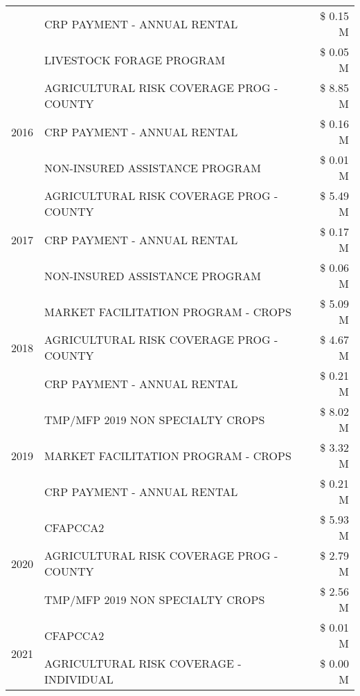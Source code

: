 \begin{tabular}{llr}
 & CRP PAYMENT - ANNUAL RENTAL & \$ 0.15 M \\
 & LIVESTOCK FORAGE PROGRAM & \$ 0.05 M \\
\cline{1-3}
\multirow[t]{3}{*}{2016} & AGRICULTURAL RISK COVERAGE PROG - COUNTY      & \$ 8.85 M \\
 & CRP PAYMENT - ANNUAL RENTAL                   & \$ 0.16 M \\
 & NON-INSURED ASSISTANCE PROGRAM                & \$ 0.01 M \\
\cline{1-3}
\multirow[t]{3}{*}{2017} & AGRICULTURAL RISK COVERAGE PROG - COUNTY & \$ 5.49 M \\
 & CRP PAYMENT - ANNUAL RENTAL & \$ 0.17 M \\
 & NON-INSURED ASSISTANCE PROGRAM & \$ 0.06 M \\
\cline{1-3}
\multirow[t]{3}{*}{2018} & MARKET FACILITATION PROGRAM - CROPS & \$ 5.09 M \\
 & AGRICULTURAL RISK COVERAGE PROG - COUNTY & \$ 4.67 M \\
 & CRP PAYMENT - ANNUAL RENTAL & \$ 0.21 M \\
\cline{1-3}
\multirow[t]{3}{*}{2019} & TMP/MFP 2019 NON SPECIALTY CROPS & \$ 8.02 M \\
 & MARKET FACILITATION PROGRAM - CROPS & \$ 3.32 M \\
 & CRP PAYMENT - ANNUAL RENTAL & \$ 0.21 M \\
\cline{1-3}
\multirow[t]{3}{*}{2020} & CFAPCCA2 & \$ 5.93 M \\
 & AGRICULTURAL RISK COVERAGE PROG - COUNTY & \$ 2.79 M \\
 & TMP/MFP 2019 NON SPECIALTY CROPS & \$ 2.56 M \\
\cline{1-3}
\multirow[t]{2}{*}{2021} & CFAPCCA2 & \$ 0.01 M \\
 & AGRICULTURAL RISK COVERAGE - INDIVIDUAL & \$ 0.00 M \\
\cline{1-3}
\bottomrule
\end{tabular}
